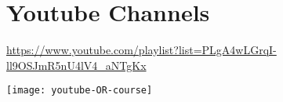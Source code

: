 
\section{Youtube Channels}
\url{https://www.youtube.com/playlist?list=PLgA4wLGrqI-ll9OSJmR5nU4lV4_aNTgKx}

\texttt{[image: youtube-OR-course]}
